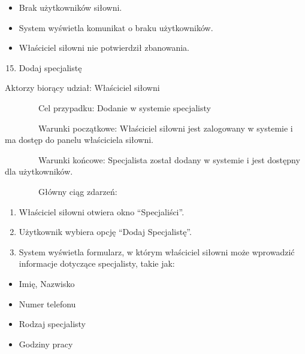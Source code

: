 \begin{itemize}
\tightlist
\item
  {Brak użytkowników siłowni.}
\end{itemize}

\begin{itemize}
\tightlist
\item
  {System wyświetla komunikat o braku użytkowników.}
\end{itemize}

\begin{itemize}
\tightlist
\item
  {Właściciel siłowni nie potwierdził zbanowania.\\
  }
\end{itemize}

{}

{}

{}

{}

{}

{}

{}

\begin{enumerate}
\setcounter{enumi}{14}
\tightlist
\item
  {Dodaj specjalistę}
\end{enumerate}

{Aktorzy biorący udział: Właściciel siłowni}

{~~~~~~~~Cel przypadku: Dodanie w systemie specjalisty}

{~~~~~~~~Warunki początkowe: Właściciel siłowni jest zalogowany w
systemie i ma dostęp do panelu właściciela siłowni.}

{~~~~~~~~Warunki końcowe: Specjalista został dodany w systemie i jest
dostępny dla użytkowników.}

{~~~~~~~~Główny ciąg zdarzeń:}

\begin{enumerate}
\tightlist
\item
  {Właściciel siłowni otwiera okno ``Specjaliści''.}
\item
  {Użytkownik wybiera opcję ``Dodaj Specjalistę''.}
\item
  {System wyświetla formularz, w którym właściciel siłowni może
  wprowadzić informacje dotyczące specjalisty, takie jak:}
\end{enumerate}

\begin{itemize}
\tightlist
\item
  {Imię, Nazwisko}
\item
  {Numer telefonu}
\item
  {Rodzaj specjalisty}
\item
  {Godziny pracy}
\end{itemize}

